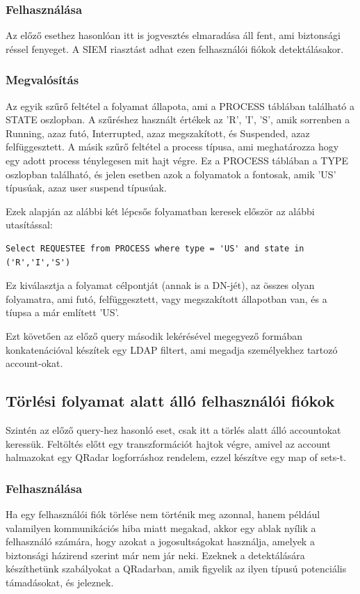 	\subsubsection{Felhasználása}
		Az előző esethez hasonlóan itt is jogvesztés elmaradása áll fent, ami biztonsági réssel fenyeget. A SIEM riasztást adhat ezen felhasználói fiókok detektálásakor. 
	\subsubsection{Megvalósítás}
		Az egyik szűrő feltétel a folyamat állapota, ami a PROCESS táblában található a STATE oszlopban. A szűréshez használt értékek az 'R', 'I', 'S', amik sorrenben a Running, azaz futó, Interrupted, azaz megszakított, és Suspended, azaz felfüggesztett. A másik szűrő feltétel a process típusa, ami meghatározza hogy egy adott process ténylegesen mit hajt végre. Ez a PROCESS táblában a TYPE oszlopban található, és jelen esetben azok a folyamatok a fontosak, amik 'US' típusúak, azaz user suspend típusúak.
		
		Ezek alapján az alábbi két lépcsős folyamatban keresek először az alábbi utasítással:
		
		\begin{lstlisting}
Select REQUESTEE from PROCESS where type = 'US' and state in ('R','I','S')
\end{lstlisting}
		Ez kiválasztja a folyamat célpontját (annak is a DN-jét), az összes olyan folyamatra, ami futó, felfüggesztett, vagy megszakított állapotban van, és a tíupsa a már említett 'US'.
		
		Ezt követően az előző query második lekérésével megegyező formában konkatenációval készítek egy LDAP filtert, ami megadja személyekhez tartozó account-okat.
		
\subsection{Törlési folyamat alatt álló felhasználói fiókok} 
Szintén az előző query-hez hasonló eset, csak itt a törlés alatt álló accountokat keressük. Feltöltés előtt egy transzformációt hajtok végre, amivel az account halmazokat egy QRadar logforráshoz rendelem, ezzel készítve egy map of sets-t.  
	\subsubsection{Felhasználása}
		Ha egy felhasználói fiók törlése nem történik meg azonnal, 
		hanem például valamilyen kommunikációs hiba miatt megakad, akkor egy ablak nyílik a felhasználó számára, hogy azokat a jogosultságokat használja, amelyek a biztonsági házirend szerint már nem jár neki. Ezeknek a detektálására készíthetünk szabályokat a QRadarban, amik figyelik az ilyen típusú potenciális támadásokat, és jeleznek.
		 
